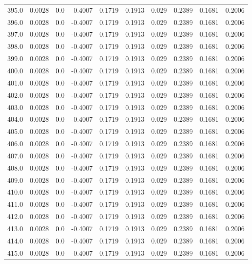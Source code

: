 \begin{longtable}{lrrrrrrrrr}
395.0 & 0.0028 & 0.0 & -0.4007 & 0.1719 & 0.1913 & 0.029 & 0.2389 & 0.1681 & 0.2006 \\
396.0 & 0.0028 & 0.0 & -0.4007 & 0.1719 & 0.1913 & 0.029 & 0.2389 & 0.1681 & 0.2006 \\
397.0 & 0.0028 & 0.0 & -0.4007 & 0.1719 & 0.1913 & 0.029 & 0.2389 & 0.1681 & 0.2006 \\
398.0 & 0.0028 & 0.0 & -0.4007 & 0.1719 & 0.1913 & 0.029 & 0.2389 & 0.1681 & 0.2006 \\
399.0 & 0.0028 & 0.0 & -0.4007 & 0.1719 & 0.1913 & 0.029 & 0.2389 & 0.1681 & 0.2006 \\
400.0 & 0.0028 & 0.0 & -0.4007 & 0.1719 & 0.1913 & 0.029 & 0.2389 & 0.1681 & 0.2006 \\
401.0 & 0.0028 & 0.0 & -0.4007 & 0.1719 & 0.1913 & 0.029 & 0.2389 & 0.1681 & 0.2006 \\
402.0 & 0.0028 & 0.0 & -0.4007 & 0.1719 & 0.1913 & 0.029 & 0.2389 & 0.1681 & 0.2006 \\
403.0 & 0.0028 & 0.0 & -0.4007 & 0.1719 & 0.1913 & 0.029 & 0.2389 & 0.1681 & 0.2006 \\
404.0 & 0.0028 & 0.0 & -0.4007 & 0.1719 & 0.1913 & 0.029 & 0.2389 & 0.1681 & 0.2006 \\
405.0 & 0.0028 & 0.0 & -0.4007 & 0.1719 & 0.1913 & 0.029 & 0.2389 & 0.1681 & 0.2006 \\
406.0 & 0.0028 & 0.0 & -0.4007 & 0.1719 & 0.1913 & 0.029 & 0.2389 & 0.1681 & 0.2006 \\
407.0 & 0.0028 & 0.0 & -0.4007 & 0.1719 & 0.1913 & 0.029 & 0.2389 & 0.1681 & 0.2006 \\
408.0 & 0.0028 & 0.0 & -0.4007 & 0.1719 & 0.1913 & 0.029 & 0.2389 & 0.1681 & 0.2006 \\
409.0 & 0.0028 & 0.0 & -0.4007 & 0.1719 & 0.1913 & 0.029 & 0.2389 & 0.1681 & 0.2006 \\
410.0 & 0.0028 & 0.0 & -0.4007 & 0.1719 & 0.1913 & 0.029 & 0.2389 & 0.1681 & 0.2006 \\
411.0 & 0.0028 & 0.0 & -0.4007 & 0.1719 & 0.1913 & 0.029 & 0.2389 & 0.1681 & 0.2006 \\
412.0 & 0.0028 & 0.0 & -0.4007 & 0.1719 & 0.1913 & 0.029 & 0.2389 & 0.1681 & 0.2006 \\
413.0 & 0.0028 & 0.0 & -0.4007 & 0.1719 & 0.1913 & 0.029 & 0.2389 & 0.1681 & 0.2006 \\
414.0 & 0.0028 & 0.0 & -0.4007 & 0.1719 & 0.1913 & 0.029 & 0.2389 & 0.1681 & 0.2006 \\
415.0 & 0.0028 & 0.0 & -0.4007 & 0.1719 & 0.1913 & 0.029 & 0.2389 & 0.1681 & 0.2006 \\

\end{longtable}
